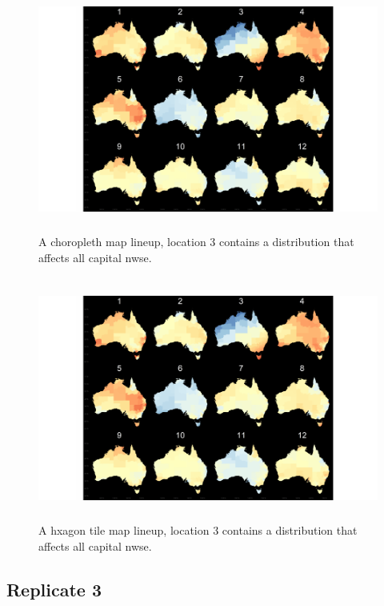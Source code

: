 \documentclass{monashthesis}
\begin{document}
\begin{figure}[H]
\centering
\includegraphics[height=8cm]{lineups/nwse-geo3-1.pdf}
\caption{\label{fig:nwse-geo3}A choropleth map lineup, location 3 contains a distribution that affects all capital nwse.}
\end{figure}

\begin{figure}[H]
\centering
\includegraphics[height=8cm]{lineups/nwse-hex3-1.pdf}
\caption{\label{fig:nwse-hex3}A hxagon tile map lineup, location 3 contains a distribution that affects all capital nwse.}
\end{figure}

\hypertarget{replicate-3-2}{%
\subsection{Replicate 3}\label{replicate-3-2}}
\end{document}
